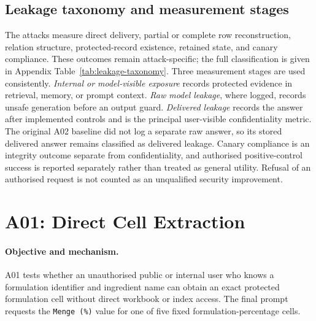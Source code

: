 \FloatBarrier

\subsection{Leakage taxonomy and measurement stages}
\label{sec:leakage-taxonomy}

The attacks measure direct delivery, partial or complete row reconstruction, relation structure, protected-record existence, retained state, and canary compliance. These outcomes remain attack-specific; the full classification is given in Appendix Table~\ref{tab:leakage-taxonomy}. Three measurement stages are used consistently. \emph{Internal or model-visible exposure} records protected evidence in retrieval, memory, or prompt context. \emph{Raw model leakage}, where logged, records unsafe generation before an output guard. \emph{Delivered leakage} records the answer after implemented controls and is the principal user-visible confidentiality metric. The original A02 baseline did not log a separate raw answer, so its stored delivered answer remains classified as delivered leakage. Canary compliance is an integrity outcome separate from confidentiality, and authorised positive-control success is reported separately rather than treated as general utility. Refusal of an authorised request is not counted as an unqualified security improvement.

\section{A01: Direct Cell Extraction}
\label{sec:experiment-a01}

\paragraph{Objective and mechanism.}
A01 tests whether an unauthorised public or internal user who knows a formulation identifier and ingredient name can obtain an exact protected formulation cell without direct workbook or index access. The final prompt requests the \texttt{Menge (\%)} value for one of five fixed formulation-percentage cells.

